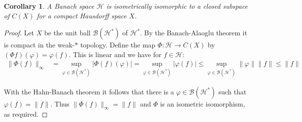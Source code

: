 \documentclass[12pt]{article}
\theoremstyle{definition}
\theoremstyle{plain}
\newtheorem*{Cor}{Corollary}
\begin{document}
\begin{Cor}
A Banach space $\mathscr{H}$ is isometrically isomorphic to a closed subspace of $C(X)$ for a compact Hausdorff space $X$.
\end{Cor}

\begin{proof}

Let $X$ be the unit ball $\mathcal{B}(\mathscr{H}^*)$ of $\mathscr{H}^*$. By the Banach-Alaoglu theorem it is compact in the weak-$*$ topology. Define the map $\Phi \colon \mathscr{H} \to C(X)$ by $(\Phi f)(\varphi) = \varphi(f)$. This is linear and we have for $f \in \mathscr{H}$:
\begin{align*}
\|\Phi(f)\|_{\infty} &= \sup_{\varphi \in \mathcal{B}(\mathscr{H}^*)} |\Phi(f)(\varphi)| = \sup_{\varphi \in \mathcal{B}(\mathscr{H}^*)} |\varphi(f)| \leq \sup_{\varphi \in \mathcal{B}(\mathscr{H}^*)} \|\varphi\| \|f\| \leq \|f\|
\end{align*}

With the Hahn-Banach theorem it follows that there is a $\varphi \in \mathcal{B}(\mathscr{H}^*)$ such that $\varphi(f) = \|f\|$. Thus $\|\Phi(f)\|_{\infty} = \|f\|$ and $\Phi$ is an isometric isomorphism, as required.
\end{proof}
\end{document}

